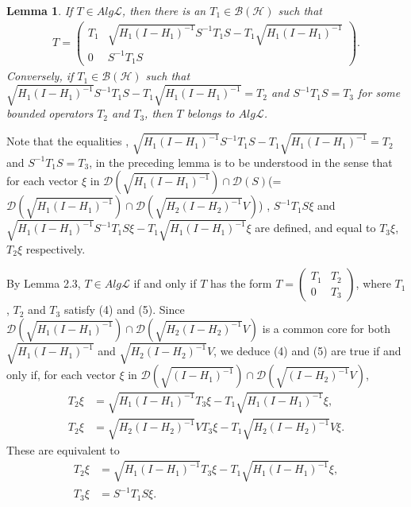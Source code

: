 \documentclass[12pt]{article}
\newtheorem{lemma}{Lemma}[section]
\newcommand{\BBB}{\mathcal B}
\newcommand{\DDD}{\mathcal D}
\newcommand{\HHH}{\mathcal H} %
\newcommand{\LLL}{\mathcal L} %
\begin{document}
{\begin{lemma}
 If $
T\in Alg\LLL$, then there is an $T_1 \in \BBB(\HHH)$ such that
\begin{align*}
T = \left(\begin{array}{cc}T_1 & \sqrt{H_{1}(I-H_{1})^{-1}}S^{-1}T_1 S -T_1 \sqrt{H_{1}(I-H_{1})^{-1}}  \\0 & S^{-1}T_1S \end{array}\right).
\end{align*}
Conversely, if $T_1 \in\BBB(\HHH)$ such that 
$\sqrt{H_{1}(I-H_{1})^{-1}}S^{-1}T_1S - T_1 \sqrt{H_{1}(I-H_{1})^{-1}} =T_2$
and $ S^{-1}T_1 S = T_3$ for some bounded operators $T_2$ and $T_3$, then $T$ belongs to $
Alg\LLL$.
\end{lemma}


Note that the equalities , $\sqrt{H_{1}(I-H_{1})^{-1}}S^{-1}T_1 S -
T_1 \sqrt{H_{1}(I-H_{1})^{-1}} = T_2$ and $S^{-1}T_1 S= T_3$, in the preceding lemma is 
to be understood in the sense that for each vector $\xi$ in $\DDD(\sqrt{H_1(I-H_1)^{-1}}) \cap
\DDD(S)$(= $\DDD(\sqrt{H_1(I-H_1)^{-1}}) \cap \DDD(\sqrt{H_2(I-H_2)^{-1}}V) $) , $S^{-1}T_1 S\xi$ and  $\sqrt{H_{1}(I-H_{1})^{-1}}S^{-1}T_1 S\xi
- T_1 \sqrt{H_{1}(I-H_{1})^{-1}}\xi$ are defined, and equal to $T_3\xi$, $T_2 \xi$ respectively. \newline


\quad By Lemma 2.3, $T \in  Alg\LLL$ if
and only if $T$ has the
 form $T = \left(\begin{array}{cc}T_1 & T_2 \\0 &
T_3\end{array}\right)$, where $T_1$, $T_2$ and $T_3$ satisfy (4) and
(5). Since $\DDD(\sqrt{H_1(I-H_1)^{-1}}) \cap
\DDD(\sqrt{H_2(I-H_2)^{-1}}V)$ is a common core for both $\sqrt{H_1(I-H_1)^{-1}}$ and $\sqrt{H_2(I-H_2)^{-1}}V$, 
we deduce (4) and (5)
are true if and only if, for each vector $\xi$ in
$\DDD(\sqrt{(I-H_1)^{-1}}) \cap \DDD(\sqrt{(I-H_2)^{-1}}V)$,
\begin{align*}
T_2 \xi &= \sqrt{H_1(I - H_1)^{-1}} T_3 \xi - T_1 \sqrt{H_1(I-H_1)^{-1}} \xi , \\
T_2 \xi &= \sqrt{H_2(I - H_2)^{-1}}V T_3 \xi - T_1
\sqrt{H_2(I-H_2)^{-1}}V \xi .
\end{align*}
These are equivalent to
\begin{align*}
T_2 \xi &= \sqrt{H_1(I - H_1)^{-1}} T_3 \xi - T_1 \sqrt{H_1(I-H_1)^{-1}} \xi, \\
T_3 \xi &= S^{-1}T_1S\xi.
\end{align*}

}
\end{document}
